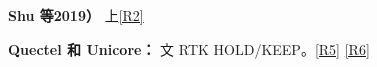 \documentclass[11pt,a4paper]{article}
\numberwithin{equation}{section}
\numberwithin{figure}{section}
\begin{document}
\textbf{Shu {\cjkfont 等}\allowbreak{}2019{\cjkfont ）}\allowbreak{}} {\cjkfont 上}\allowbreak{}\hyperlink{ref-R2}{[R2]}

\textbf{Quectel {\cjkfont 和}\allowbreak{} Unicore{\cjkfont ：}\allowbreak{}} {\cjkfont 文}\allowbreak{} RTK HOLD/\allowbreak{}KEEP{\cjkfont 。}\allowbreak{}\hyperlink{ref-R5}{[R5]} \hyperlink{ref-R6}{[R6]}
\end{document}
